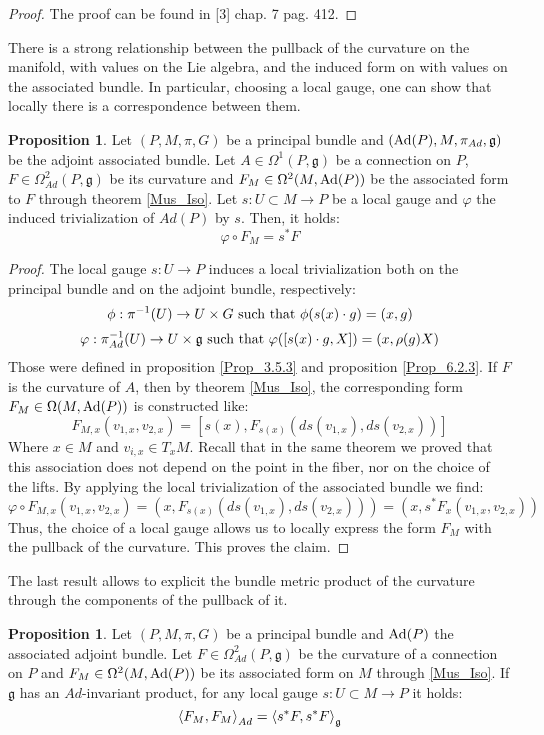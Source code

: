 \documentclass[12pt,a4paper]{report}
\theoremstyle{definition}
\theoremstyle{Theorem}
\newtheorem{Prop}[Def]{Proposition}
\theoremstyle{definition}
\theoremstyle{definition}
\begin{document}
	\begin{proof}
		The proof can be found in [3] chap. 7 pag. 412.
	\end{proof}
	There is a strong relationship between the pullback of the curvature on the manifold, with values on the Lie algebra, and the induced form on with values on the associated bundle. In particular, choosing a local gauge, one can show that locally there is a correspondence between them.
	\begin{Prop}\label{God_Prop}
		Let $(P,M,\pi,G)$ be a principal bundle and $(\hbox{Ad}(P),M,\pi_{Ad},\mathfrak{g})$ be the adjoint associated bundle. Let $A\in \Omega^1(P,\mathfrak{g})$ be a connection on $P$, $F\in\Omega^2_{Ad}(P,\mathfrak{g})$ be its curvature and $F_M\in\Omega^2(M,\hbox{Ad}(P))$ be the associated form to $F$ through theorem \ref{Mus_Iso}. Let $s:U\subset M\rightarrow P$ be a local gauge and $\varphi$ the induced trivialization of $Ad(P)$ by $s$. Then, it holds: 
		$$\varphi\circ F_{M}=s^*F$$
	\end{Prop}
	\begin{proof}
		The local gauge $s:U\rightarrow P$ induces a local trivialization both on the principal bundle and on the adjoint bundle, respectively:
		$$\phi: \pi^{-1}(U)\rightarrow U\times G\hbox{ such that }\phi(s(x)\cdot g)=(x,g)$$
		$$\varphi: \pi_{Ad}^{-1}(U)\rightarrow U\times \mathfrak{g}\hbox{ such that }\varphi([s(x)\cdot g,X])=(x,\rho(g)X)$$
		Those were defined in proposition \ref{Prop_3.5.3} and proposition \ref{Prop_6.2.3}. If $F$ is the curvature of $A$, then by theorem \ref{Mus_Iso}, the corresponding form $F_M\in\Omega(M,\hbox{Ad}(P))$ is constructed like:
		$$F_{M,x}(v_{1,x},v_{2,x})=[s(x),F_{s(x)}(ds(v_{1,x}),ds(v_{2,x}))]$$
		Where $x\in M$ and $v_{i,x}\in T_xM$.
		Recall that in the same theorem we proved that this association does not depend on the point in the fiber, nor on the choice of the lifts.
		By applying the local trivialization of the associated bundle we find:
		$$\varphi\circ F_{M,x}(v_{1,x},v_{2,x})=(x,F_{s(x)}(ds(v_{1,x}),ds(v_{2,x})))=(x,s^*F_{x}(v_{1,x},v_{2,x}))$$
		Thus, the choice of a local gauge allows us to locally express the form $F_M$ with the pullback of the curvature. This proves the claim.
	\end{proof}
	The last result allows to explicit the bundle metric product of the curvature through the components of the pullback of it.
	\begin{Prop}
		Let $(P,M,\pi,G)$ be a principal bundle and $\hbox{Ad}(P)$ the associated adjoint bundle. Let $F\in\Omega^2_{Ad}(P,\mathfrak{g})$ be the curvature of a connection on $P$ and $F_M\in\Omega^2(M,\hbox{Ad}(P))$ be its associated form on $M$ through \ref{Mus_Iso}. If $\mathfrak{g}$ has an $Ad$-invariant product, for any local gauge $s:U\subset M\rightarrow P$ it holds:
		$$\braket{F_M,F_M}_{Ad}=\braket{s^*F,s^*F}_\mathfrak{g}$$
	\end{Prop}
\end{document}

